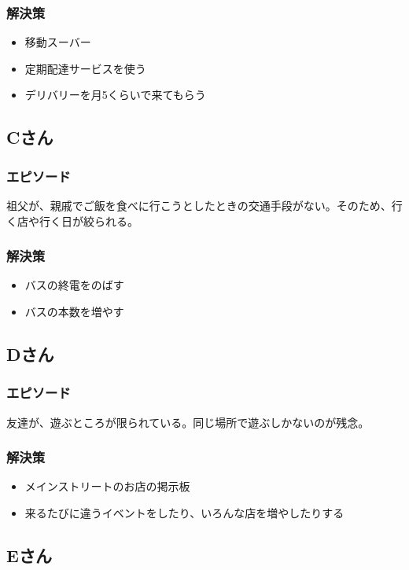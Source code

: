 \documentclass[a4paper,12pt, uplatex]{jsbook}
\begin{document}
\subsubsection{解決策}
\begin{itemize}
  \item 移動スーバー
  \item 定期配達サービスを使う
  \item デリバリーを月5くらいで来てもらう
\end{itemize}


\subsection{Cさん}
\subsubsection{エピソード}
祖父が、親戚でご飯を食べに行こうとしたときの交通手段がない。そのため、行く店や行く日が絞られる。

\subsubsection{解決策}
\begin{itemize}
  \item バスの終電をのばす
  \item バスの本数を増やす
\end{itemize}


\subsection{Dさん}
\subsubsection{エピソード}
友達が、遊ぶところが限られている。同じ場所で遊ぶしかないのが残念。

\subsubsection{解決策}
\begin{itemize}
  \item メインストリートのお店の掲示板
  \item 来るたびに違うイベントをしたり、いろんな店を増やしたりする
\end{itemize}


\subsection{Eさん}
\end{document}
